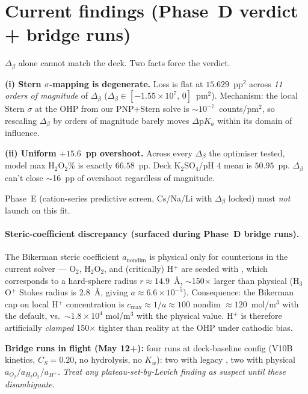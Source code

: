 \documentclass[11pt]{article}
\begin{document}
\section{Current findings (Phase~D verdict + bridge runs)}
\label{sec:findings}

\begin{verdictbox}
$\Delta_\beta$ alone cannot match the deck.  Two facts force the
verdict.

\textbf{(i) Stern $\sigma$-mapping is degenerate.} Loss is flat at
$15.629$~pp$^2$ across \emph{11 orders of magnitude} of $\Delta_\beta$
($\Delta_\beta \in [-1.55\times 10^7,\, 0]$~pm$^2$).  Mechanism: the
local Stern $\sigma$ at the OHP from our PNP+Stern solve is
$\sim 10^{-7}$~counts/pm$^2$, so rescaling $\Delta_\beta$ by orders
of magnitude barely moves $\Delta\mathrm{p}K_a$ within its domain of
influence.

\textbf{(ii) Uniform $+15.6$~pp overshoot.} Across every $\Delta_\beta$
the optimiser tested, model max H$_2$O$_2$\% is exactly $66.58$~pp.
Deck K$_2$SO$_4$/pH 4 mean is $50.95$~pp.  $\Delta_\beta$ can't close
$\sim$16~pp of overshoot regardless of magnitude.

Phase~E (cation-series predictive screen, Cs/Na/Li with $\Delta_\beta$
locked) must \emph{not} launch on this fit.
\end{verdictbox}

\paragraph{Steric-coefficient discrepancy (surfaced during Phase~D bridge runs).}
The Bikerman steric coefficient $a_{\mathrm{nondim}}$ is physical only
for counterions in the current solver --- O$_2$, H$_2$O$_2$, and (critically) H$^+$ are
seeded with , which corresponds to a
hard-sphere radius $r \approx 14.9$~\AA, $\sim$150$\times$ larger
than physical (H$_3$O$^+$ Stokes radius is $2.8$~\AA, giving
$a \approx 6.6\times 10^{-5}$).  Consequence: the Bikerman cap on
local H$^+$ concentration is $c_{\max}\approx 1/a\approx 100$ nondim
$\approx 120$~mol/m$^3$ with the default, vs.\ $\sim 1.8\times 10^4$
mol/m$^3$ with the physical value.  H$^+$ is therefore artificially
\emph{clamped} 150$\times$ tighter than reality at the OHP under
cathodic bias.

\textbf{Bridge runs in flight (May 12+):} four runs at deck-baseline
config (V10B kinetics, $C_S=0.20$, no hydrolysis, no $K_w$): two with
legacy , two with physical $a_{O_2}/a_{H_2O_2}/a_{H^+}$.
\emph{Treat any plateau-set-by-Levich finding as suspect until these
disambiguate.}
\end{document}
